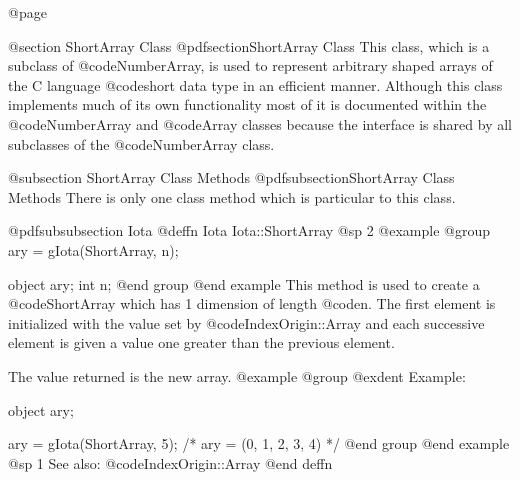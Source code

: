 @page

@section  ShortArray Class
@pdfsection{ShortArray Class}
This class, which is a subclass of @code{NumberArray}, is used to
represent arbitrary shaped arrays of the C language @code{short} data
type in an efficient manner.  Although this class implements much of its
own functionality most of it is documented within the @code{NumberArray}
and @code{Array} classes because the interface is shared by all
subclasses of the @code{NumberArray} class.

@subsection ShortArray Class Methods
@pdfsubsection{ShortArray Class Methods}
There is only one class method which is particular to this class.








@pdfsubsubsection {Iota}
@deffn {Iota} Iota::ShortArray
@sp 2
@example
@group
ary = gIota(ShortArray, n);

object    ary;
int       n;
@end group
@end example
This method is used to create a @code{ShortArray} which has 1 dimension
of length @code{n}.  The first element is initialized with the value
set by @code{IndexOrigin::Array} and each successive element is given
a value one greater than the previous element.

The value returned is the new array.
@example
@group
@exdent Example:

object  ary;

ary = gIota(ShortArray, 5);
/*  ary = (0, 1, 2, 3, 4)  */
@end group
@end example
@sp 1
See also:  @code{IndexOrigin::Array}
@end deffn









